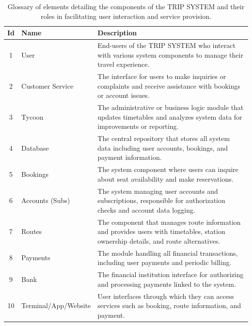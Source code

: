 \begin{table}[H]
    \centering
    \begin{tabular}{@{}clp{9cm}@{}}
    \toprule
    \textbf{Id} & \textbf{Name} & \textbf{Description} \\
    \midrule
    1 & User & End-users of the TRIP SYSTEM who interact with various system components to manage their travel experience. \\
    2 & Customer Service & The interface for users to make inquiries or complaints and receive assistance with bookings or account issues. \\
    3 & Tycoon & The administrative or business logic module that updates timetables and analyzes system data for improvements or reporting. \\
    4 & Database & The central repository that stores all system data including user accounts, bookings, and payment information. \\
    5 & Bookings & The system component where users can inquire about seat availability and make reservations. \\
    6 & Accounts (Subs) & The system managing user accounts and subscriptions, responsible for authorization checks and account data logging. \\
    7 & Routes & The component that manages route information and provides users with timetables, station ownership details, and route alternatives. \\
    8 & Payments & The module handling all financial transactions, including user payments and periodic billing. \\
    9 & Bank & The financial institution interface for authorizing and processing payments linked to the system. \\
    10 & Terminal/App/Website & User interfaces through which they can access services such as booking, route information, and payment. \\
    \bottomrule
    \end{tabular}
    \caption{Glossary of elements detailing the components of the TRIP SYSTEM and their roles in facilitating user interaction and service provision.}
    \label{tab:glossary_trip_system}
\end{table}

